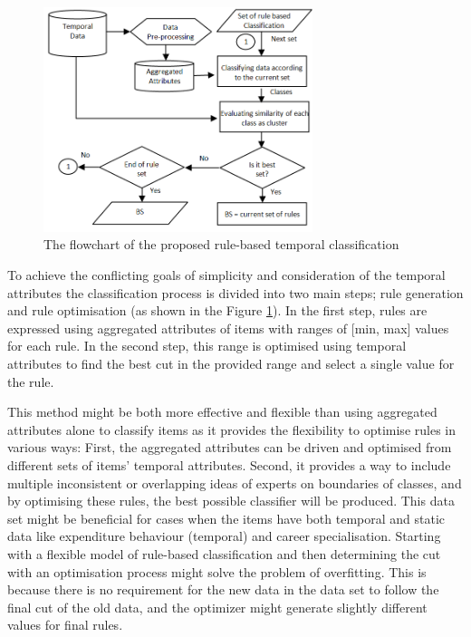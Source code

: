 \begin{figure}[!h]
	\centering
	\includegraphics[width=0.7\textwidth]{images/chapter3/FlowchartTemporalClassification.png}
	\caption{The flowchart of the proposed rule-based temporal classification}
	\label{fig:FlowchartTemporalClassification}
\end{figure}

To achieve the conflicting goals of simplicity and consideration of the temporal attributes the classification process is divided into two main steps; rule generation and rule optimisation (as shown in the Figure \ref{fig:FlowchartTemporalClassification}). In the first step, rules are expressed using aggregated attributes of items with ranges of [min, max] values for each rule. In the second step, this range is optimised using temporal attributes to find the best cut in the provided range and select a single value for the rule.



This method might be both more effective and flexible than using aggregated attributes alone to classify items as it provides the flexibility to optimise rules in various ways: First, the aggregated attributes can be driven and optimised from different sets of items' temporal attributes. Second, it provides a way to include multiple inconsistent or overlapping ideas of experts on boundaries of classes, and by optimising these rules, the best possible classifier will be produced. This data set might be beneficial for cases when the items have both temporal and static data like expenditure behaviour (temporal) and career specialisation. Starting with a flexible model of rule-based classification and then determining the cut with an optimisation process might solve the problem of overfitting. This is because there is no requirement for the new data in the data set to follow the final cut of the old data, and the optimizer might generate slightly different values for final rules.


